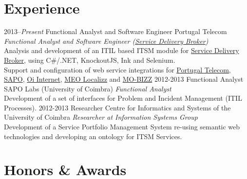 \documentclass[]{friggeri-cv} %
\begin{document}
\section{Experience}

\begin{entrylist}
\entry
{2013--\emph{Present}}
{Functional Analyst and Software Engineer}
{Portugal Telecom}
{\emph{Functional Analyst and Software Engineer (\href{http://sdb.sapo.pt/en/index.html}{Service Delivery Broker})}\\
Analysis and development of an ITIL based ITSM module for \href{http://sdb.sapo.pt/en/index.html}{Service Delivery Broker}, using C\#/.NET, KnockoutJS, Ink and Selenium.\\
Support and configuration of web service integrations for \href{http://www.telecom.pt/InternetResource/PTSite/PT}{Portugal Telecom}, \href{http://www.sapo.pt/}{SAPO}, \href{http://www.oi.com.br/}{Oi Internet}, \href{https://meolocalizz.meo.pt}{MEO Localizz} and \href{http://www2.mobizz-project.eu/}{MO-BIZZ}}
\entry
{2012-2013}
{Functional Analyst}
{SAPO Labs (University of Coimbra)}
{\emph{Functional Analyst}\\
Development of a set of interfaces for Problem and Incident Management (ITIL Processes).}
\entry
{2012-2013}
{Researcher}
{Centre for Informatics and Systems of the University of Coimbra}
{\emph{Researcher at Information Systems Group}\\
Development of a Service Portfolio Management System re-using semantic web technologies and developing an ontology for ITSM Services.}

\end{entrylist}


\section{Honors \& Awards}
\end{document}
